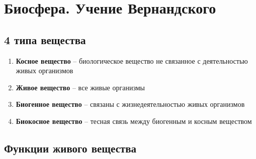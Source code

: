 \chapter{Биосфера. Учение Вернандского}

\section{4 типа вещества}

\begin{enumerate}
    \item \textbf{Косное вещество} --
        биологическое вещество не связанное с деятельностью
        живых организмов

    \item \textbf{Живое вещество} --
        все живые организмы

    \item \textbf{Биогенное вещество} --
        связаны с жизнедеятельностью живых организмов

    \item \textbf{Биокосное вещество} --
        тесная связь между биогенным и косным веществом
\end{enumerate}

\section{Функции живого вещества}

